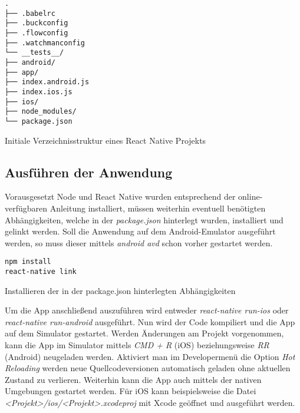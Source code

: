         
\begin{lstlisting}[style=tree]
.
├── .babelrc
├── .buckconfig
├── .flowconfig
├── .watchmanconfig
└── __tests__/
├── android/
├── app/
├── index.android.js
├── index.ios.js
├── ios/
├── node_modules/
└── package.json
    \end{lstlisting}
\vspace{-0.5 cm}
\begin{listing}[H]
    \caption{Initiale Verzeichnisstruktur eines React Native Projekts}
    \label{lst:idirectory_structure}
\end{listing}




\subsection{Ausführen der Anwendung}
Vorausgesetzt Node und React Native wurden entsprechend der online-verfügbaren Anleitung installiert, müssen weiterhin eventuell benötigten Abhängigkeiten, welche in der \textit{package.json} hinterlegt wurden, installiert und gelinkt werden. Soll die Anwendung auf dem Android-Emulator ausgeführt werden, so muss dieser mittels \textit{android avd} schon vorher gestartet werden.
\begin{listing}[H]
    \begin{verbatim}
npm install
react-native link
    \end{verbatim}
    \caption{Installieren der in der package.json hinterlegten Abhängigkeiten}
    \label{lst:install_dependencies}
\end{listing}

Um die App anschließend auszuführen wird entweder \textit{react-native run-ios} oder \textit{react-native run-android} ausgeführt. Nun wird der Code kompiliert und die App auf dem Simulator gestartet. Werden Änderungen am Projekt vorgenommen, kann die App im Simulator mittels \textit{CMD + R} (iOS) beziehungsweise \textit{RR} (Android) neugeladen werden. Aktiviert man im Developermenü die Option \textit{Hot Reloading} werden neue Quellcodeversionen automatisch geladen ohne aktuellen Zustand zu verlieren. Weiterhin kann die App auch mittels der nativen Umgebungen gestartet werden. Für iOS kann beispielsweise die Datei \textit{<Projekt>/ios/<Projekt>.xcodeproj} mit Xcode geöffnet und ausgeführt werden.

